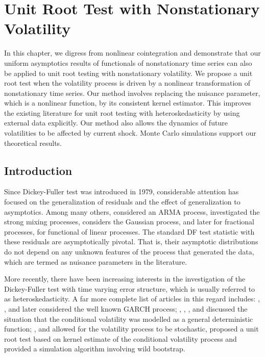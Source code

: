 \chapter{Unit Root Test with Nonstationary Volatility} 
\ifpdf
    \graphicspath{{Chapter5/Chapter5Figs/PNG/}{Chapter5/Chapter5Figs/PDF/}{Chapter5/Chapter5Figs/}}
\else
    \graphicspath{{Chapter5/Chapter5Figs/EPS/}{Chapter5/Chapter5Figs/}}
\fi
In this chapter, we digress from nonlinear cointegration and demonstrate that our uniform asymptotics results of functionals of nonstationary time series can also be applied to unit root testing with nonstationary volatility. We propose a unit root test when the volatility process is driven by a nonlinear transformation of nonstationary time series. Our method involves replacing the nuisance parameter, which is a nonlinear function, by its consistent kernel estimator. This improves the existing literature for unit root testing with heteroskedasticity by using external data  explicitly. Our method also allows the dynamics of future volatilities to be affected by current shock. Monte Carlo simulations support our theoretical results.


\section{Introduction}

Since Dickey-Fuller test was introduced in 1979, considerable attention  has focused on the generalization of residuals and the effect of generalization to asymptotics. Among many others, \cite{saiddickey1984} considered an ARMA process, \cite{phillips1987} investigated  the strong mixing processes, \cite{chanterrin1995} considers the Gaussian process, \cite{sowell1990} and later \cite{wanglingulati2003} for fractional processes, \cite{wu2006} for functional of linear processes. The standard DF test statistic with these residuals are asymptotically pivotal. That is, their asymptotic distributions do not depend on any unknown features of the process that generated the data, which are termed as nuisance parameters in the literature.

More recently, there have been increasing interests in the investigation of the Dickey-Fuller test with time varying error structure, which is  usually referred to as heteroskedasticity. A far more complete list of articles in this regard includes:
\cite{kimschmidt1993}, \cite{hansenrahbek1998},  \cite{boswijk2001} and later \cite{linglimcaleer2003} considered   the well known GARCH process;
\cite{hamoritokihisa1997}, \cite{kimleybournenewbold2002}, \cite{cavaliere2005}, \cite{cavalieretaylor2008a} and \cite{beare2008} discussed  the situation that the conditional volatility was modelled as a general deterministic function;
 \cite{boswijk2005},  \cite{xu2008} and  \citet[][\citeyear{cavalieretaylor2008b}, \citeyear{cavalieretaylor2009}]{cavalieretaylor2007}  allowed for the volatility process to be stochastic, proposed a unit root test based on kernel estimate of the conditional volatility process and provided a simulation algorithm involving wild bootstrap.

